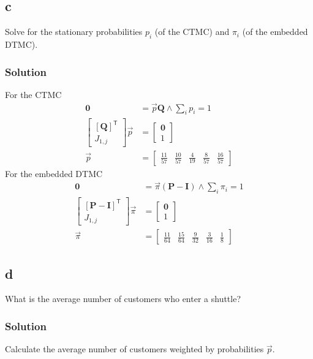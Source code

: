 \documentclass[letterpaper]{amsart}
\begin{document}
\subsection*{c}
Solve for the stationary probabilities $p_i$ (of the CTMC) and $\pi_i$ (of the
embedded DTMC).
\subsubsection*{Solution}
For the CTMC
\begin{align*}
  \mathbf{0} &=\vec{p}\mathbf{Q}
               \land
  \sum_ip_i=1\\
\begin{bmatrix}
  \left[\mathbf{Q}\right]^\mathsf{T} \\
  J_{1,j}
\end{bmatrix}
  \vec{p} &=
              \begin{bmatrix}
                \mathbf{0} \\
                1
              \end{bmatrix}
  \\
  \vec{p} &=
\begin{bmatrix}
  \frac{11}{57} &
  \frac{10}{57} &
  \frac{4}{19} &
  \frac{8}{57} &
  \frac{16}{57}
\end{bmatrix}
\end{align*}
For the embedded DTMC
\begin{align*}
  \mathbf{0} &=\vec{\pi}(\mathbf{P}-\mathbf{I})
               \land
  \sum_i\pi_i=1\\
\begin{bmatrix}
  \left[\mathbf{P}-\mathbf{I}\right]^\mathsf{T} \\
  J_{1,j}
\end{bmatrix}
  \vec{\pi} &=
              \begin{bmatrix}
                \mathbf{0} \\
                1
              \end{bmatrix}
  \\
  \vec{\pi} &=
\begin{bmatrix}
  \frac{11}{64} &
  \frac{15}{64} &
  \frac{9}{32} &
  \frac{3}{16} &
  \frac{1}{8}
\end{bmatrix}
\end{align*}
\subsection*{d}
What is the average number of customers who enter a shuttle?
\subsubsection*{Solution}
Calculate the average number of customers weighted by probabilities $\vec{p}$.
\end{document}
